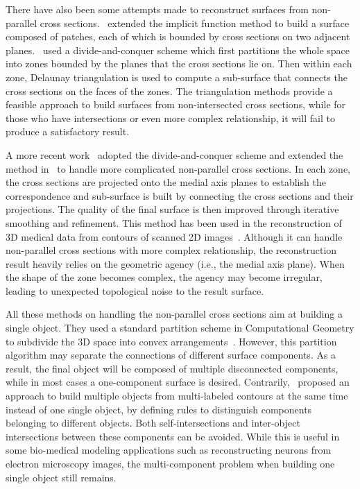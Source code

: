 There have also  been some attempts made to reconstruct surfaces
from non-parallel cross sections.~\cite{RU90, WMTBDC95, BTS04}
extended the implicit function method to build a surface composed
of patches, each of which is bounded by cross sections on two
adjacent planes.~\cite{PT94,DP97,BM07} used a divide-and-conquer
scheme which first partitions the whole space into zones bounded by
the planes that the cross sections lie on. Then within each zone,
Delaunay triangulation is used to compute a sub-surface that
connects the cross sections on the faces of the zones. The
triangulation methods provide a feasible approach to build surfaces
from non-intersected cross sections, while for those who have
intersections or even more complex relationship, it will fail to
produce a satisfactory result.

A more recent  work~\cite{LBDLJ08}  adopted the divide-and-conquer
scheme and extended the method in~\cite{JWCET05} to handle more
complicated non-parallel cross sections. In each zone, the cross
sections are projected onto the medial axis planes to establish the
correspondence and sub-surface is built by connecting the cross
sections and their projections. The quality of the final surface is
then improved through iterative smoothing and refinement. This
method has been used in the reconstruction of 3D medical data from
contours of scanned 2D images~\cite{SLJGAGL09}. Although it can
handle non-parallel cross sections with more complex relationship,
the reconstruction result heavily relies on the geometric agency
(i.e., the medial axis plane). When the shape of the zone becomes
complex, the agency may become irregular, leading to unexpected
topological noise to the result surface.

All these methods on handling the non-parallel cross sections aim at
building a single object. They used a standard partition scheme in
Computational Geometry to subdivide the 3D space into convex
arrangements~\cite{BM07}. However, this partition algorithm may
separate the connections of different surface components. As a
result, the final object will be composed of multiple disconnected
components, while in most cases a one-component surface is desired.
Contrarily,~\cite{EB11} proposed an approach to build multiple
objects from multi-labeled contours at the same time instead of one
single object, by defining rules to distinguish components belonging
to different objects. Both self-intersections and inter-object
intersections between these components can be avoided. While this is
useful in some bio-medical modeling applications such as
reconstructing neurons from electron microscopy images, the
multi-component problem when building one single object still
remains.

